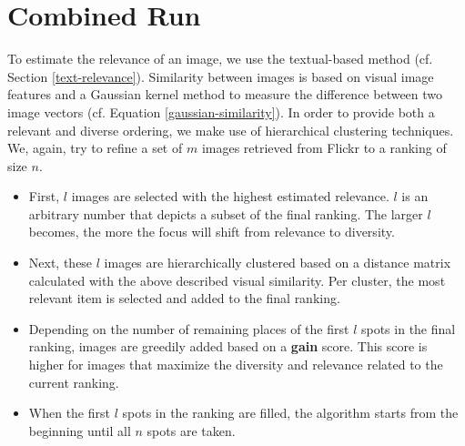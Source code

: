 \documentclass{acm_proc_article-me11_tweaked}
\begin{document}
\section{Combined Run}
To estimate the relevance of an image, we use the textual-based method (cf. Section \ref{text-relevance}).
Similarity between images is based on visual image features and a Gaussian kernel method to measure the difference between two image vectors (cf. Equation \ref{gaussian-similarity}).
In order to provide both a relevant and diverse ordering, we make use of hierarchical clustering techniques.
We, again, try to refine a set of $m$ images retrieved from Flickr to a ranking of size $n$.
\begin{itemize}[leftmargin=*]
 \item First, $l$ images are selected with the highest estimated relevance. $l$ is an arbitrary number that depicts a subset of the final ranking. 
The larger $l$ becomes, the more the focus will shift from relevance to diversity. 
 \item Next, these $l$ images are hierarchically clustered based on a distance matrix calculated with the above described visual similarity.
Per cluster, the most relevant item is selected and added to the final ranking.
 \item Depending on the number of remaining places of the first $l$ spots in the final ranking, images are greedily added based on a \textbf{gain} score.
 This score is higher for images that maximize the diversity and relevance related to the current ranking.
 \item When the first $l$ spots in the ranking are filled, the algorithm starts from the beginning until all $n$ spots are taken.
\end{itemize}
\end{document}
